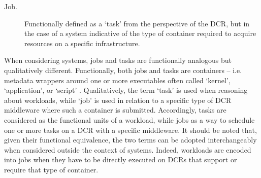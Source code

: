 \documentclass{sig-alternate}
\begin{document}
\begin{description}

\item[Job.] Functionally defined as a `task' from the perspective of the DCR,
but in the case of a \pilotjob system indicative of the type of container
required to acquire resources on a specific infrastructure.

\end{description}

When considering \pilotjob systems, jobs and tasks are functionally analogous
but qualitatively different. Functionally, both jobs and tasks are containers --
i.e. metadata wrappers around one or more executables often called `kernel',
`application', or `script' . Qualitatively, the term `task' is used when reasoning about workloads,
while `job' is used in relation to a specific type of DCR middleware where such
a container is submitted. Accordingly, tasks are considered as the functional
units of a workload, while jobs as a way to schedule one or more tasks on a DCR
with a specific middleware.  It should be noted that, given their functional
equivalence, the two terms can be adopted interchangeably when considered
outside the context of \pilotjob systems. Indeed, workloads are encoded into
jobs when they have to be directly executed on DCRs that support or require that
type of container.



\end{document}
